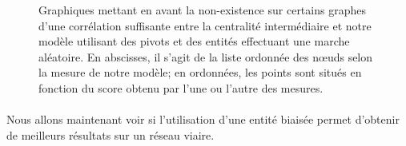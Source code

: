 \documentclass[a4paper, 10pt]{report}
\begin{document}
\begin{figure}[htbp]
{	}
	\caption{Graphiques mettant en avant la non-existence sur certains graphes d'une corrélation suffisante entre la centralité intermédiaire et notre modèle utilisant des pivots et des entités effectuant une marche aléatoire. En abscisses, il s'agit de la liste ordonnée des n\oe uds selon la mesure de notre modèle; en ordonnées, les points sont situés en fonction du score obtenu par l'une ou l'autre des mesures.}
	\label{fig:non_correlation_centralite_pivots_marche_aleatoire}
\end{figure}

%
%

\paragraph{}Nous allons maintenant voir si l'utilisation d'une entité biaisée permet d'obtenir de meilleurs résultats sur un réseau viaire.

\begin{table}[htbp]
	\centering
	\caption{Coefficient de corrélation entre la centralité intermédiaire et notre modèle avec pivots et des entités effectuant une marche aléatoire biaisée.}
	\label{tab:non_correlation_centralite_pivots_marche_biaise}
\end{table}
\end{document}
